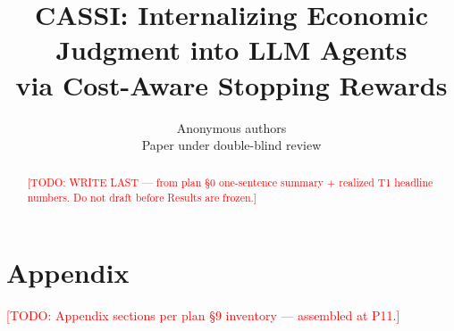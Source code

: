 \documentclass{article}
\title{CASSI: Internalizing Economic Judgment into LLM Agents\\
       via Cost-Aware Stopping Rewards}
\author{Anonymous authors\\
        \small Paper under double-blind review
        }
\date{}
\newcommand{\TODO}[1]{\textcolor{red}{[TODO: #1]}}
\begin{document}
\maketitle

\begin{abstract}
\TODO{WRITE LAST --- from plan \S0 one-sentence summary + realized T1 headline
numbers. Do not draft before Results are frozen.}
\end{abstract}










\nocite{*}  %
%
  {}%
  {}


\appendix
\section*{Appendix}
\TODO{Appendix sections per plan \S9 inventory --- assembled at P11.}
\end{document}
